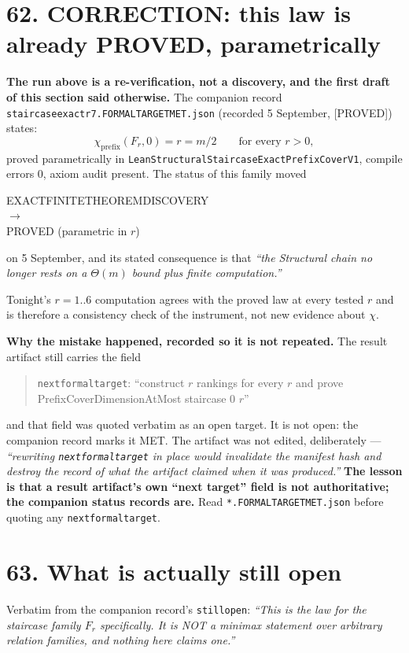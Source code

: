 \documentclass[9pt,twocolumn]{article}
\newcommand{\eclass}[1]{\textsf{[#1]}}
\renewcommand{\_}{\CIGunderscore\allowbreak}
\begin{document}
\section*{62. CORRECTION: this law is already PROVED, parametrically}
\textbf{The run above is a re-verification, not a discovery, and the first draft of this section said otherwise.} The companion record
\texttt{staircase\_\allowbreak exact\_\allowbreak r7\_.\allowbreak FORMAL\_\allowbreak TARGET\_\allowbreak MET.json}
(recorded 5 September, \eclass{PROVED}) states:
\[\chi_{\text{prefix}}(F_r,0)=r=m/2\qquad\text{for every }r>0,\]
proved parametrically in \texttt{Lean\allowbreak Structural\allowbreak Staircase\allowbreak Exact\allowbreak PrefixCoverV1}, compile errors $0$, axiom audit present. The status of this family moved
\begin{center}\scriptsize\textsf{EXACT\_FINITE\_THEOREM\_DISCOVERY}\\$\longrightarrow$\\\textsf{PROVED (parametric in }$r$)\end{center}
on 5 September, and its stated consequence is that \emph{``the Structural chain no longer rests on a $\Theta(m)$ bound plus finite computation.''}

Tonight's $r=1..6$ computation agrees with the proved law at every tested $r$ and is therefore a consistency check of the instrument, not new evidence about $\chi$.

\textbf{Why the mistake happened, recorded so it is not repeated.} The result artifact still carries the field
\begin{quote}\scriptsize\texttt{next\_formal\_target}: ``construct $r$ rankings for every $r$ and prove \textsf{PrefixCoverDimensionAtMost} staircase $0$ $r$''\end{quote}
and that field was quoted verbatim as an open target. It is not open: the companion record marks it \textsf{MET}. The artifact was not edited, deliberately --- \emph{``rewriting \texttt{next\_formal\_target} in place would invalidate the manifest hash and destroy the record of what the artifact claimed when it was produced.''} \textbf{The lesson is that a result artifact's own ``next target'' field is not authoritative; the companion status records are.} Read \texttt{*.FORMAL\_TARGET\_MET.json} before quoting any \texttt{next\_formal\_target}.

\section*{63. What is actually still open}
Verbatim from the companion record's \texttt{still\_open}: \emph{``This is the law for the staircase family $F_r$ specifically. It is NOT a minimax statement over arbitrary relation families, and nothing here claims one.''}
\end{document}
